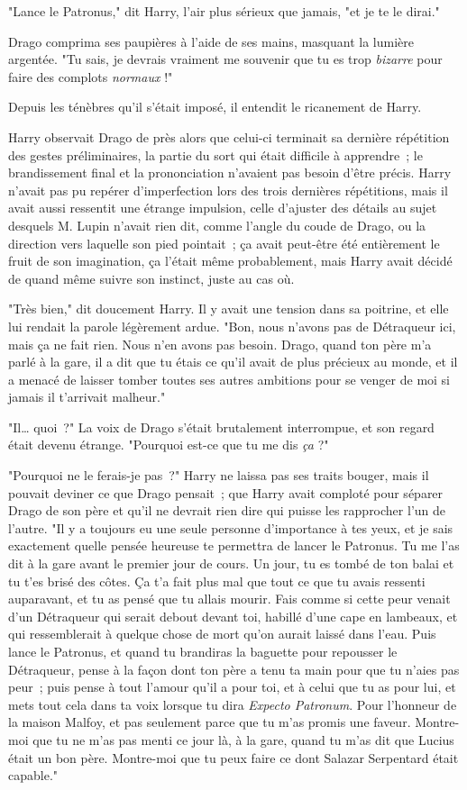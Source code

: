 "Lance le Patronus," dit Harry, l'air plus sérieux que jamais, "et je te le dirai."

Drago comprima ses paupières à l'aide de ses mains, masquant la lumière argentée. "Tu sais, je devrais vraiment me souvenir que tu es trop \emph{bizarre} pour faire des complots \emph{normaux} !"

Depuis les ténèbres qu'il s'était imposé, il entendit le ricanement de Harry.

\later

Harry observait Drago de près alors que celui-ci terminait sa dernière répétition des gestes préliminaires, la partie du sort qui était difficile à apprendre~; le brandissement final et la prononciation n'avaient pas besoin d'être précis. Harry n'avait pas pu repérer d'imperfection lors des trois dernières répétitions, mais il avait aussi ressentit une étrange impulsion, celle d'ajuster des détails au sujet desquels M. Lupin n'avait rien dit, comme l'angle du coude de Drago, ou la direction vers laquelle son pied pointait~; ça avait peut-être été entièrement le fruit de son imagination, ça l'était même probablement, mais Harry avait décidé de quand même suivre son instinct, juste au cas où.

"Très bien," dit doucement Harry. Il y avait une tension dans sa poitrine, et elle lui rendait la parole légèrement ardue. "Bon, nous n'avons pas de Détraqueur ici, mais ça ne fait rien. Nous n'en avons pas besoin. Drago, quand ton père m'a parlé à la gare, il a dit que tu étais ce qu'il avait de plus précieux au monde, et il a menacé de laisser tomber toutes ses autres ambitions pour se venger de moi si jamais il t'arrivait malheur."

"Il… quoi~?" La voix de Drago s'était brutalement interrompue, et son regard était devenu étrange. "Pourquoi est-ce que tu me dis \emph{ça} ?"

"Pourquoi ne le ferais-je pas~?" Harry ne laissa pas ses traits bouger, mais il pouvait deviner ce que Drago pensait~; que Harry avait comploté pour séparer Drago de son père et qu'il ne devrait rien dire qui puisse les rapprocher l'un de l'autre. "Il y a toujours eu une seule personne d'importance à tes yeux, et je sais exactement quelle pensée heureuse te permettra de lancer le Patronus. Tu me l'as dit à la gare avant le premier jour de cours. Un jour, tu es tombé de ton balai et tu t'es brisé des côtes. Ça t'a fait plus mal que tout ce que tu avais ressenti auparavant, et tu as pensé que tu allais mourir. Fais comme si cette peur venait d'un Détraqueur qui serait debout devant toi, habillé d'une cape en lambeaux, et qui ressemblerait à quelque chose de mort qu'on aurait laissé dans l'eau. Puis lance le Patronus, et quand tu brandiras la baguette pour repousser le Détraqueur, pense à la façon dont ton père a tenu ta main pour que tu n'aies pas peur~; puis pense à tout l'amour qu'il a pour toi, et à celui que tu as pour lui, et mets tout cela dans ta voix lorsque tu dira \emph{Expecto Patronum}. Pour l'honneur de la maison Malfoy, et pas seulement parce que tu m'as promis une faveur. Montre-moi que tu ne m'as pas menti ce jour là, à la gare, quand tu m'as dit que Lucius était un bon père. Montre-moi que tu peux faire ce dont Salazar Serpentard était capable."

